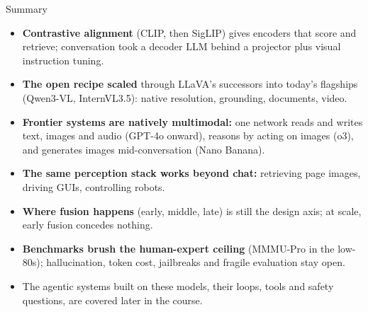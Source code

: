 \begin{frame}{Summary}
  \small
  \begin{itemize}
    \item[\textcolor{red}{$\blacktriangleright$}] \textbf{Contrastive alignment} (CLIP, then SigLIP) gives
      encoders that score and retrieve; conversation took a decoder LLM behind a projector plus visual
      instruction tuning.
    \item[\textcolor{red}{$\blacktriangleright$}] \textbf{The open recipe scaled} through LLaVA's successors
      into today's flagships (Qwen3-VL, InternVL3.5): native resolution, grounding, documents, video.
    \item[\textcolor{red}{$\blacktriangleright$}] \textbf{Frontier systems are natively multimodal:} one
      network reads and writes text, images and audio (GPT-4o onward), reasons by acting on images (o3),
      and generates images mid-conversation (Nano Banana).
    \item[\textcolor{red}{$\blacktriangleright$}] \textbf{The same perception stack works beyond chat:}
      retrieving page images, driving GUIs, controlling robots.
    \item[\textcolor{red}{$\blacktriangleright$}] \textbf{Where fusion happens} (early, middle, late) is
      still the design axis; at scale, early fusion concedes nothing.
    \item[\textcolor{red}{$\blacktriangleright$}] \textbf{Benchmarks brush the human-expert ceiling}
      (MMMU-Pro in the low-80s); hallucination, token cost, jailbreaks and fragile evaluation stay open.
    \item[\textcolor{red}{$\blacktriangleright$}] The agentic systems built on these models, their loops,
      tools and safety questions, are covered later in the course.
  \end{itemize}
\end{frame}
